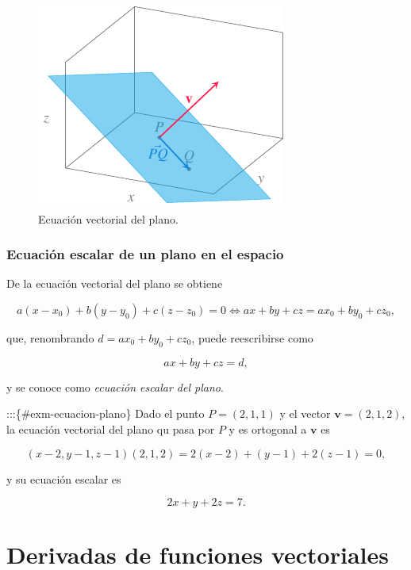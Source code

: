 \documentclass[
  a4paper,
]{scrreport}
\theoremstyle{definition}
\theoremstyle{plain}
\theoremstyle{plain}
\theoremstyle{plain}
\theoremstyle{definition}
\theoremstyle{remark}
\begin{document}
\begin{figure}

{\centering \includegraphics{img/geometria-plano-espacio/ecuacion-plano.pdf}

}

\caption{Ecuación vectorial del plano.}

\end{figure}

\hypertarget{ecuaciuxf3n-escalar-de-un-plano-en-el-espacio}{%
\subsection{Ecuación escalar de un plano en el
espacio}\label{ecuaciuxf3n-escalar-de-un-plano-en-el-espacio}}

De la ecuación vectorial del plano se obtiene

\[
a(x-x_0)+b(y-y_0)+c(z-z_0) = 0 \Leftrightarrow ax+by+cz=ax_0+by_0+cz_0,
\]

que, renombrando \(d=ax_0+by_0+cz_0\), puede reescribirse como

\[
ax+by+cz=d,
\]

y se conoce como \emph{ecuación escalar del plano}.

:::\{\#exm-ecuacion-plano\} Dado el punto \(P=(2,1,1)\) y el vector
\(\mathbf{v}=(2,1,2)\), la ecuación vectorial del plano qu pasa por
\(P\) y es ortogonal a \(\mathbf{v}\) es

\[
(x-2,y-1,z-1)(2,1,2)=2(x-2)+(y-1)+2(z-1)=0,
\]

y su ecuación escalar es

\[
2x+y+2z=7.
\]


\hypertarget{derivadas-de-funciones-vectoriales}{%
\chapter{Derivadas de funciones
vectoriales}\label{derivadas-de-funciones-vectoriales}}
\end{document}
